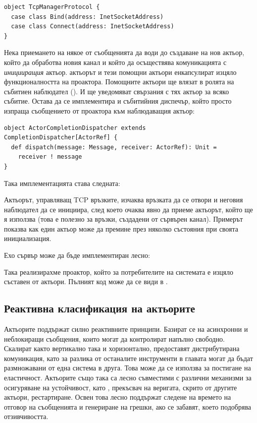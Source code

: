 \begin{lstlisting}
object TcpManagerProtocol {
  case class Bind(address: InetSocketAddress)
  case class Connect(address: InetSocketAddress)
}
\end{lstlisting}

Нека приемането на някое от съобщенията да води до създаване на нов актьор, който да обработва новия канал и който да осъществява комуникацията с \emph{иницииращия} актьор.  актьорът и тези помощни актьори енкапсулират изцяло функционалността на проактора. Помощните актьори ще влязат в ролята на събитиен наблюдател (). И ще уведомяват свързания с тях актьор за всяко събитие. Остава да се имплементира и събитийния диспечър, който просто изпраща съобщението от проактора към наблюдаващия актьор:

\begin{lstlisting}
object ActorCompletionDispatcher extends CompletionDispatcher[ActorRef] {
  def dispatch(message: Message, receiver: ActorRef): Unit =
    receiver ! message
}
\end{lstlisting}

Така имплементацията става следната:



Актьорът, управляващ TCP връзките, изчаква връзката да се отвори и неговия наблюдател да се инициира, след което очаква явно да приеме актьорът, който ще я използва (това е полезно за връзки, създадени от сървърен канал). Примерът показва как един актьор може да премине през няколко състояния при своята инициализация.

Ехо сървър може да бъде имплементиран лесно:



Така реализирахме проактор, който за потребителите на системата е изцяло съставен от актьори. Пълният код може да се види в .

\subsection{Реактивна класификация на актьорите}

Актьорите поддържат силно реактивните принципи. Базират се на асинхронни и неблокиращи съобщения, които могат да контролират напълно свободно. Скалират както вертикално така и хоризонтално, предоставят дистрибутирана комуникация, като за разлика от останалите инструменти в главата могат да бъдат размножавани от една система в друга. Това може да се използва за постигане на еластичност. Актьорите също така са лесно съвместими с различни механизми за осигуряване на устойчивост, като , прекъсвач на веригата, скрито от другите актьори, рестартиране. Освен това лесно поддържат следене на времето на отговор на съобщенията и генериране на грешки, ако се забавят, което подобрява отзивчивостта.

